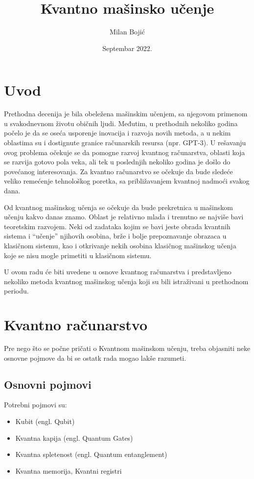 \documentclass[12pt, letterpaper, oneside]{article}
\title{Kvantno mašinsko učenje}
\author{Milan Bojić}
\date{Septembar 2022.}
\begin{document}
\maketitle
\newpage

\tableofcontents
\newpage
\section{Uvod}
Prethodna decenija je bila obeležena mašinskim učenjem, sa njegovom primenom u svakodnevnom životu običnih ljudi.
Međutim, u prethodnih nekoliko godina počelo je da se oseća usporenje inovacija i razvoja novih metoda, a u nekim oblastima su i dostignute granice računarskih resursa (npr. GPT-3).
U rešavanju ovog problema očekuje se da pomogne razvoj kvantnog računarstva, oblasti koja  se razvija gotovo pola veka, ali tek u poslednjih nekoliko godina je došlo do
povećanog interesovanja. Za kvantno računarstvo se očekuje da bude sledeće veliko remećenje tehnološkog poretka, sa približavanjem kvantnoj nadmoći svakog dana.

Od kvantnog mašinskog učenja se očekuje da bude prekretnica u mašinskom učenju kakvo danas znamo. Oblast je relativno mlada i trenutno se najviše bavi teoretskim razvojem.
Neki od zadataka kojim se bavi jeste obrada kvantnih sistema i ``učenje'' njihovih osobina, brže i bolje prepoznavanje obrazaca u klasičnom sistemu, kao i
otkrivanje nekih osobina klasičnog mašinskog učenja koje se nisu mogle primetiti u klasičnom sistemu.

U ovom radu će biti uvedene u osnove kvantnog računarstva i predstavljeno nekoliko metoda kvantnog mašinskog učenja koji su bili istraživani u prethodnom periodu.

\newpage
\section{Kvantno računarstvo}
Pre nego što se počne pričati o Kvantnom mašinskom učenju, treba objasniti neke osnovne pojmove da bi se ostatk rada mogao lakše razumeti.

\subsection{Osnovni pojmovi}
Potrebni pojmovi su:
\begin{itemize}
    \item Kubit (engl. Qubit)
    \item Kvantna kapija (engl. Quantum Gates)
    \item Kvantna spletenost (engl. Quantum entanglement)
    \item Kvantna memorija, Kvantni registri
\end{itemize}
\end{document}
